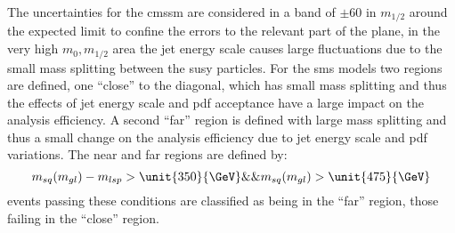 The uncertainties for the \ac{cmssm} are considered in a band of 
$\pm$\unit{60}{\GeV} in $m_{1/2}$ around the expected limit to confine the 
errors to the relevant part of the plane, in the very high $m_{0},m_{1/2}$ area 
the jet energy scale causes large fluctuations due to the small mass splitting 
between the \ac{susy} particles.
For the \ac{sms} models two regions are defined, one ``close'' to the diagonal, 
which has small mass splitting and thus the effects of jet energy scale and 
\ac{pdf} acceptance have a large impact on the analysis efficiency. A second 
``far'' region is defined with large mass splitting and thus a small change on 
the analysis efficiency due to jet energy scale and \ac{pdf} variations. The 
near and far regions are defined by:
\begin{equation}
  m_{sq}(m_{gl}) - m_{lsp} > \unit{350}{\GeV} \&\& m_{sq}(m_{gl}) > \unit{475}{\GeV}
\end{equation}
events passing these conditions are classified as being in the ``far'' region, 
those failing in the ``close'' region.

 
